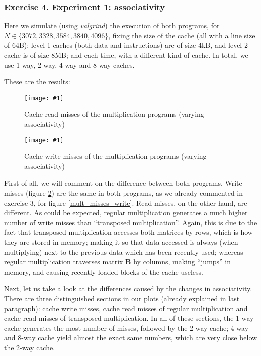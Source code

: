 \documentclass{article}
\newcommand{\myFigure}[4]{%
    \begin{figure}[!ht]
        \texttt{[image: \#1]}
        \centering
        \caption{#2}
        \label{#3}
    \end{figure}
}
\begin{document}
\subsubsection*{Exercise 4. Experiment 1: associativity}

Here we simulate (using \emph{valgrind}) the execution of both programs, for $N\in\{3072,3328,3584,3840,4096\}$, fixing the size of the cache (all with a line size of 64B): level 1 caches (both data and instructions) are of size 4kB, and level 2 cache is of size 8MB; and each time, with a different kind of cache. In total, we use 1-way, 2-way, 4-way and 8-way caches.

These are the results:

\myFigure{../material_P3/protect_out4/asoc/p2/4096/lectura.png}{Cache read misses of the multiplication programs (varying associativity)}{asoc_lectura}{0.55}

\myFigure{../material_P3/protect_out4/asoc/p2/4096/escritura.png}{Cache write misses of the multiplication programs (varying associativity)}{asoc_escritura}{0.55}

First of all, we will comment on the difference between both programs. Write misses (figure \ref{asoc_escritura}) are the same in both programs, as we already commented in exercise 3, for figure \ref{mult_misses_write}. Read misses, on the other hand, are different. As could be expected, regular multiplication generates a much higher number of write misses than ``transposed multiplication''. Again, this is due to the fact that transposed multiplication accesses both matrices by rows, which is how they are stored in memory; making it so that data accessed is always (when multiplying) next to the previous data which has been recently used; whereas regular multiplication traverses matrix $\mathbf{B}$ by columns, making ``jumps'' in memory, and causing recently loaded blocks of the cache useless.

Next, let us take a look at the differences caused by the changes in associativity. There are three distinguished sections in our plots (already explained in last paragraph): cache write misses, cache read misses of regular multiplication and cache read misses of transposed multiplication. In all of these sections, the 1-way cache generates the most number of misses, followed by the 2-way cache; 4-way and 8-way cache yield almost the exact same numbers, which are very close below the 2-way cache. 
\end{document}
